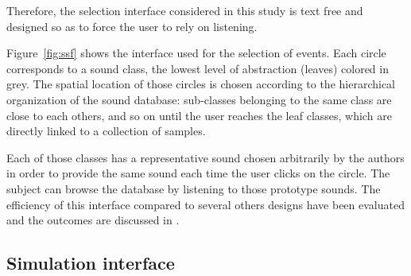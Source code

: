\documentclass[12pt]{elsarticle}
\begin{document}

Therefore, the selection interface considered in this study is text free and designed so as to force the user to rely on listening.


Figure~\ref{fig:ssf} shows the interface used for the selection of events. Each circle corresponds to a sound class, the lowest level of abstraction (leaves) colored in grey. The spatial location of those circles is chosen according to the hierarchical organization of the sound database: sub-classes belonging to the same class are close to each others, and so on until the user reaches the leaf classes, which are directly linked to a collection of samples.


Each of those classes has a representative sound chosen arbitrarily by the authors in order to provide the same sound each time the user clicks on the circle. The subject can browse the database by listening to those prototype sounds. The efficiency of this interface compared to several others designs have been evaluated and the outcomes are discussed in \cite{lafay2016JAES}.

\subsection{Simulation interface}
\end{document}

